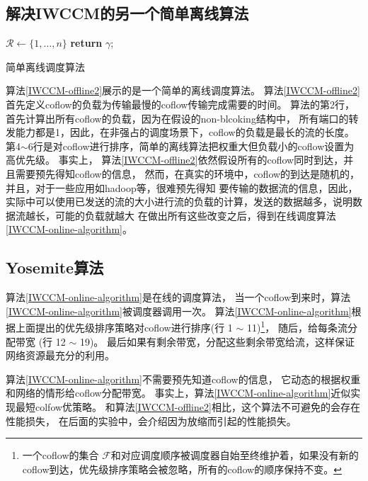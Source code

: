  \subsection{解决IWCCM的另一个简单离线算法}
 \begin{algorithm}
$\mathcal{R} \gets \{1, \dots, n\}$\;
  \textbf{return} $\gamma$;
  \caption{简单离线调度算法}
  \label{IWCCM-offline2}
 \end{algorithm}
 
 
 算法\ref{IWCCM-offline2}展示的是一个简单的离线调度算法。
  算法\ref{IWCCM-offline2}首先定义coflow的负载为传输最慢的coflow传输完成需要的时间。
 算法的第2行，首先计算出所有coflow的负载，因为在假设的non-blcoking结构中，
 所有端口的转发能力都是1，因此，在非强占的调度场景下，coflow的负载是最长的流的长度。
 第4$\sim$6行是对coflow进行排序，简单的离线算法把权重大但负载小的coflow设置为高优先级。
事实上， 算法\ref{IWCCM-offline2}依然假设所有的coflow同时到达，并且需要预先得知coflow的信息，
然而，在真实的环境中，coflow的到达是随机的，并且，对于一些应用如hadoop等，很难预先得知
要传输的数据流的信息，因此，实际中可以使用已发送的流的大小进行流的负载的计算，发送的数据越多，说明数据流越长，可能的负载就越大
在做出所有这些改变之后，得到在线调度算法\ref {IWCCM-online-algorithm}。


\subsection{Yosemite算法}
 
 算法\ref {IWCCM-online-algorithm}是在线的调度算法，
当一个coflow到来时，算法\ref {IWCCM-online-algorithm}被调度器调用一次。
算法\ref {IWCCM-online-algorithm}根据上面提出的优先级排序策略对coflow进行排序(行 1 $\sim$ 11)\footnote{一个coflow的集合 $\mathcal{F}$和对应调度顺序被调度器自始至终维护着，如果没有新的coflow到达，优先级排序策略会被忽略，所有的coflow的顺序保持不变。}，
随后，给每条流分配带宽 (行 12 $\sim$ 19)。
最后如果有剩余带宽，分配这些剩余带宽给流，这样保证网络资源最充分的利用。

算法\ref{IWCCM-online-algorithm}不需要预先知道coflow的信息，
它动态的根据权重和网络的情形给coflow分配带宽。
事实上，算法\ref{IWCCM-online-algorithm}近似实现最短colfow优策略。
和算法\ref{IWCCM-offline2}相比，这个算法不可避免的会存在性能损失，
在后面的实验中，会介绍因为放缩而引起的性能损失。
 
